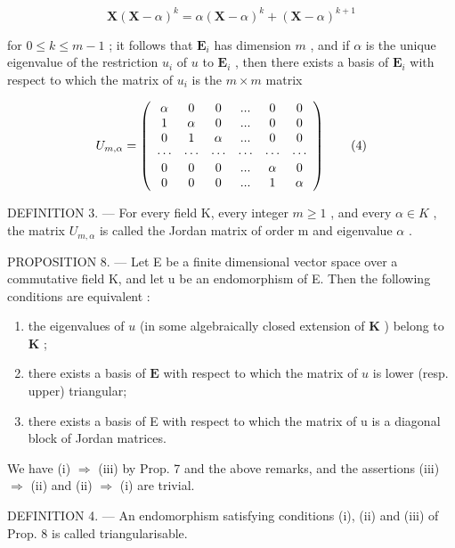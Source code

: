 \[
\mathbf {X} (\mathbf {X} - \alpha) ^ {k} = \alpha (\mathbf {X} - \alpha) ^ {k} + (\mathbf {X} - \alpha) ^ {k + 1}
\]

for \(0 \leqslant k \leqslant m - 1\) ; it follows that \(\mathbf{E}_i\) has dimension \(m\) , and if \(\alpha\) is the unique eigenvalue of the restriction \(u_i\) of \(u\) to \(\mathbf{E}_i\) , then there exists a basis of \(\mathbf{E}_i\) with respect to which the matrix of \(u_i\) is the \(m \times m\) matrix

\[
U _ {m, \alpha} = \left( \begin{array}{c c c c c c} \alpha & 0 & 0 & ... & 0 & 0 \\ 1 & \alpha & 0 & ... & 0 & 0 \\ 0 & 1 & \alpha & ... & 0 & 0 \\ \cdots & \cdots & \cdots & \cdots & \cdots & \cdots \\ 0 & 0 & 0 & ... & \alpha & 0 \\ 0 & 0 & 0 & ... & 1 & \alpha \end{array} \right)\tag{4}
\]

DEFINITION 3. --- For every field K, every integer \(m \geqslant 1\) , and every \(\alpha \in K\) , the matrix \(U_{m,\alpha}\) is called the Jordan matrix of order m and eigenvalue \(\alpha\) .

PROPOSITION 8. --- Let E be a finite dimensional vector space over a commutative field K, and let u be an endomorphism of E. Then the following conditions are equivalent :

\begin{enumerate}
\def\labelenumi{(\roman{enumi})}
\item
  the eigenvalues of \(u\) (in some algebraically closed extension of \(\mathbf{K}\) ) belong to \(\mathbf{K}\) ;
\item
  there exists a basis of \(\mathbf{E}\) with respect to which the matrix of \(u\) is lower (resp. upper) triangular;
\item
  there exists a basis of E with respect to which the matrix of u is a diagonal block of Jordan matrices.
\end{enumerate}

We have (i) \(\Rightarrow\) (iii) by Prop. 7 and the above remarks, and the assertions (iii) \(\Rightarrow\) (ii) and (ii) \(\Rightarrow\) (i) are trivial.

DEFINITION 4. --- An endomorphism satisfying conditions (i), (ii) and (iii) of Prop. 8 is called triangularisable.

